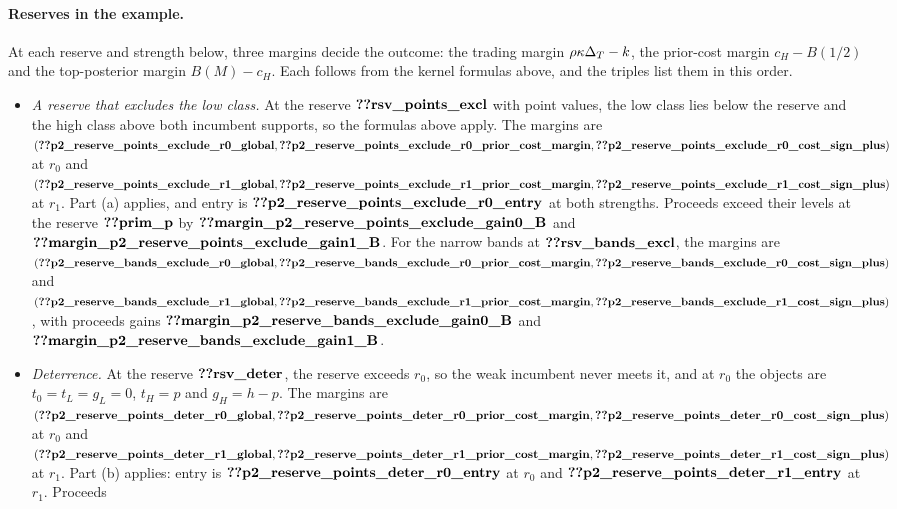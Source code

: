 \paragraph{Reserves in the example.}
At each reserve and strength below, three margins decide the outcome: the trading margin \(\rho\kappa\Delta_T-k\), the
prior-cost margin \(c_H-B(1/2)\) and the top-posterior margin \(B(M)-c_H\). Each follows from the kernel formulas
above, and the triples list them in this order.
\begin{itemize}[leftmargin=2em]
\item \emph{A reserve that excludes the low class.} At the reserve \(\reg{rsv_points_excl}\) with point values, the low
class lies below the reserve and the high class above both incumbent supports, so the formulas above apply. The
margins are \((\reg{p2_reserve_points_exclude_r0_global},\reg{p2_reserve_points_exclude_r0_prior_cost_margin},
\reg{p2_reserve_points_exclude_r0_cost_sign_plus})\) at \(r_0\) and
\((\reg{p2_reserve_points_exclude_r1_global},\reg{p2_reserve_points_exclude_r1_prior_cost_margin},
\reg{p2_reserve_points_exclude_r1_cost_sign_plus})\) at \(r_1\). Part (a) applies, and entry is
\(\reg{p2_reserve_points_exclude_r0_entry}\) at both strengths. Proceeds exceed their levels at the reserve
\(\reg{prim_p}\) by \(\reg{margin_p2_reserve_points_exclude_gain0_B}\) and \(\reg{margin_p2_reserve_points_exclude_gain1_B}\).
For the narrow bands at \(\reg{rsv_bands_excl}\), the margins are
\((\reg{p2_reserve_bands_exclude_r0_global},\reg{p2_reserve_bands_exclude_r0_prior_cost_margin},
\reg{p2_reserve_bands_exclude_r0_cost_sign_plus})\) and
\((\reg{p2_reserve_bands_exclude_r1_global},\reg{p2_reserve_bands_exclude_r1_prior_cost_margin},
\reg{p2_reserve_bands_exclude_r1_cost_sign_plus})\), with proceeds gains \(\reg{margin_p2_reserve_bands_exclude_gain0_B}\)
and \(\reg{margin_p2_reserve_bands_exclude_gain1_B}\).
\item \emph{Deterrence.} At the reserve \(\reg{rsv_deter}\), the reserve exceeds \(r_0\), so the weak incumbent never
meets it, and at \(r_0\) the objects are \(t_0=t_L=g_L=0\), \(t_H=p\) and \(g_H=h-p\). The margins are
\((\reg{p2_reserve_points_deter_r0_global},\reg{p2_reserve_points_deter_r0_prior_cost_margin},
\reg{p2_reserve_points_deter_r0_cost_sign_plus})\) at \(r_0\) and
\((\reg{p2_reserve_points_deter_r1_global},\reg{p2_reserve_points_deter_r1_prior_cost_margin},
\reg{p2_reserve_points_deter_r1_cost_sign_plus})\) at \(r_1\). Part (b) applies: entry is
\(\reg{p2_reserve_points_deter_r0_entry}\) at \(r_0\) and \(\reg{p2_reserve_points_deter_r1_entry}\) at \(r_1\). Proceeds

\end{itemize}

